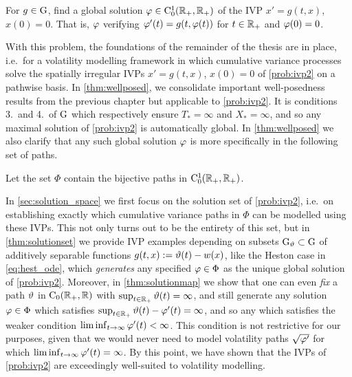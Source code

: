 \begin{problem}\label{prob:ivp2}
    For $g\in \mathrm{G}$, find a global solution $\varphi\in\mathrm{C}^1_0(\mathbb{R}_+,\mathbb{R}_+)$ of the IVP $x'=g(t,x)$, $x(0)=0$. That is, $\varphi$ verifying $\varphi'(t)=g(t,\varphi(t))$ for $t\in\mathbb{R}_+$ and $\varphi(0)=0$.
\end{problem}

With this problem, the foundations of the remainder of the thesis are in place, i.e.~for a volatility modelling framework in which cumulative variance processes solve the spatially irregular IVPs $x'=g(t,x)$, $x(0)=0$ of \autoref{prob:ivp2} on a pathwise basis. In \autoref{thm:wellposed}, we consolidate important well-posedness results from the previous chapter but applicable to \autoref{prob:ivp2}. It is conditions 3.~and 4.~of $\mathrm{G}$ which respectively ensure $T_*=\infty$ and $X_*=\infty$, and so any maximal solution of \autoref{prob:ivp2} is automatically global. In \autoref{thm:wellposed} we also clarify that any such global solution $\varphi$ is more specifically in the following set of paths.
\begin{definition}\label{def:solutionset}
    Let the set $\Phi$ contain the bijective paths in $\mathrm{C}^1_0(\mathbb{R}_+,\mathbb{R}_+)$.
\end{definition}
In \autoref{sec:solution_space} we first focus on the solution set of \autoref{prob:ivp2}, i.e.~on establishing exactly which cumulative variance paths in $\Phi$ can be modelled using these IVPs. This not only turns out to be the entirety of this set, but in \autoref{thm:solutionset} we provide IVP examples depending on subsets $\mathrm{G}_\vartheta\subset\mathrm{G}$ of additively separable functions $g(t,x) := \vartheta(t) - w(x)$, like the Heston case in \autoref{eq:hest_ode}, which \emph{generates} any specified $\varphi\in\Phi$ as the unique global solution of \autoref{prob:ivp2}. Moreover, in \autoref{thm:solutionmap} we show that one can even \emph{fix} a path $\vartheta$ in $\mathrm{C}_0(\mathbb{R}_+,\mathbb{R})$ with $\sup_{t\in\mathbb{R}_+}\vartheta(t)=\infty$, and still generate any solution $\varphi\in\Phi$ which satisfies $\sup_{t\in\mathbb{R}_+}\vartheta(t)-\varphi'(t)=\infty$, and so any which satisfies the weaker condition $\liminf_{t\to\infty}\varphi'(t)<\infty$. This condition is not restrictive for our purposes, given that we would never need to model volatility paths $\sqrt{\varphi'}$ for which $\liminf_{t\to\infty}\varphi'(t)=\infty$. By this point, we have shown that the IVPs of \autoref{prob:ivp2} are exceedingly well-suited to volatility modelling.

